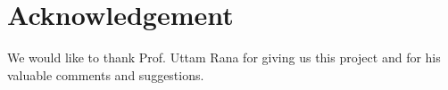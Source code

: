 \documentclass[../main.tex]{subfiles}
\begin{document}
\section{Acknowledgement}

We would like to thank  Prof. Uttam Rana for giving us this project and
for his valuable comments and suggestions.
\end{document}
